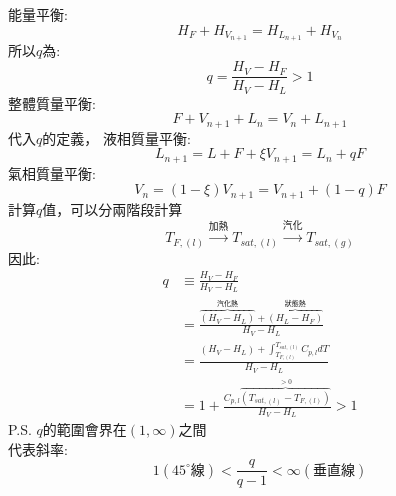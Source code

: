 \documentclass[../main.tex]{subfiles}
\begin{document}
\begin{itemize}
\begin{itemize}
    能量平衡:
    \begin{equation}
      H_F + H_{V_{n+1}} = H_{L_{n+1}} + H_{V_n}
    \end{equation}
    所以$q$為:
    \begin{equation}
      q = \frac{H_V - H_F}{H_V - H_L} > 1
    \end{equation}
    整體質量平衡:
    \begin{equation}
      F + V_{n+1}  + L_{n} = V_{n} + L_{n+1}
    \end{equation}
    代入$q$的定義，
    液相質量平衡:
    \begin{equation}
      L_{n+1} = L + F + \xi V_{n+1}  = L_n + qF
    \end{equation}
    氣相質量平衡:
    \begin{equation}
      V_n = (1-\xi) V_{n+1} = V_{n+1} + (1-q)F
    \end{equation}
    計算$q$值，可以分兩階段計算
    \begin{equation}
      T_{F,(l)} \xrightarrow{\text{加熱}} T_{sat,(l)} \xrightarrow{\text{汽化}} T_{sat,(g)}
    \end{equation}
    因此:
    \begin{align}
      q &\equiv \frac{H_V-H_F}{H_V-H_L} \nonumber\\
      &= \frac{\overbrace{(H_V-H_L)}^{\text{汽化熱}} +
      \overbrace{(H_L -H_F)}^{\text{狀態熱}}}{H_V-H_L} \nonumber\\
      &= \frac{(H_V-H_L)+\int_{T_{F,(l)}}^{T_{sat,(l)}} C_{p,l} dT}{H_V-H_L} \nonumber\\
      &= 1 + \frac{C_{p,l} \overbrace{(T_{sat,(l)} - T_{F,(l)})}^{>0}}{H_V-H_L} >1 
    \end{align}
    P.S. $q$的範圍會界在$(1, \infty)$之間\\
    代表斜率:
    \begin{equation}
      1 (45^\circ\text{線}) < \frac{q}{q-1} < \infty (\text{垂直線})
    \end{equation}
    \begin{figure}[H]
      \centering
\end{figure}
\end{itemize}
\end{itemize}
\end{document}
